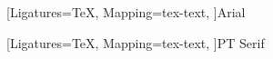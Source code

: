 \newfontfamily{\NotoSansFont}[Ligatures=TeX,
    Mapping=tex-text,
    ]{Arial}
    
\newfontfamily{\NotoSerifFont}[Ligatures=TeX,
    Mapping=tex-text,
    ]{PT Serif}

% 
\ifluatex
\newfontfamily{}
    
\newfontfamily{}
\else
\ifxetex
\newfontfamily{}
    
\newfontfamily{}
\else
\newcommand\coverlfont{\fontfamily{helvet}\selectfont\sffamily}
\newcommand\coverbfont{\fontfamily{helvet}\selectfont\sffamily\bfseries}
\fi
\fi
